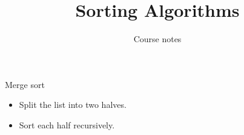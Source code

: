 \documentclass{beamer}
\title{Sorting Algorithms}
\author{Course notes}
\date{}
\begin{document}
\begin{frame}{Merge sort}
\begin{itemize}
\item Split the list into two halves.
\item Sort each half recursively.
\end{itemize}
\end{frame}
\end{document}
